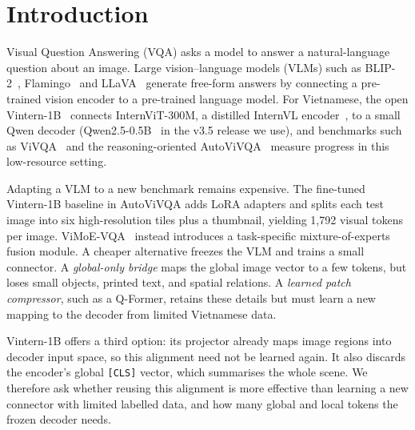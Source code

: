 \section{Introduction}
\label{sec:intro}

Visual Question Answering (VQA) asks a model to answer a natural-language question about an
image. Large vision--language models (VLMs) such as BLIP-2~\cite{li2023blip2},
Flamingo~\cite{alayrac2022flamingo} and LLaVA~\cite{liu2023visualinstructiontuning} generate
free-form answers by connecting a pre-trained vision encoder to a pre-trained language model. For
Vietnamese, the open Vintern-1B~\cite{doan2024vintern1b} connects InternViT-300M, a distilled
InternVL encoder~\cite{chen2024internvl}, to a small Qwen decoder (Qwen2.5-0.5B~\cite{qwen2025qwen25}
in the v3.5 release we use), and benchmarks
such as ViVQA~\cite{tran2021vivqa} and the reasoning-oriented AutoViVQA~\cite{autovivqa2026}
measure progress in this low-resource setting.

Adapting a VLM to a new benchmark remains expensive. The fine-tuned Vintern-1B baseline in
AutoViVQA adds LoRA adapters and splits each test image into six high-resolution tiles plus a
thumbnail, yielding 1{,}792 visual tokens per image. ViMoE-VQA~\cite{vimoevqa} instead introduces
a task-specific mixture-of-experts fusion module. A cheaper alternative freezes the VLM and trains
a small connector. A \emph{global-only bridge} maps the global image vector to a few tokens, but
loses small objects, printed text, and spatial relations. A \emph{learned patch compressor}, such
as a Q-Former, retains these details but must learn a new mapping to the decoder from limited
Vietnamese data.

Vintern-1B offers a third option: its projector already maps image regions into decoder input
space, so this alignment need not be learned again. It also discards the encoder's global
\texttt{[CLS]} vector, which summarises the whole scene. We therefore ask whether reusing this
alignment is more effective than learning a new connector with limited labelled data, and how many
global and local tokens the frozen decoder needs.

